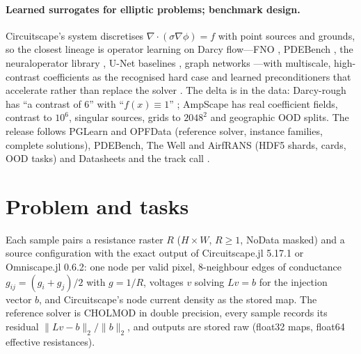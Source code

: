 \documentclass{article}
\begin{document}
\paragraph{Learned surrogates for elliptic problems; benchmark design.} Circuitscape's system discretises $\nabla\cdot(\sigma\nabla\phi)=f$ with point sources and grounds, so the closest lineage is operator learning on Darcy flow---FNO \citep{li2021}, PDEBench \citep{takamoto2022}, the neuraloperator library \citep{kossaifi2024}, U-Net baselines \citep{ronneberger2015,gupta2022}, graph networks \citep{battaglia2018,pfaff2021}---with multiscale, high-contrast coefficients as the recognised hard case \citep{liu2024,he2024,xu2024,haltmayer2026,trifonov2024} and learned preconditioners that accelerate rather than replace the solver \citep{lan2024,li2023}. The delta is in the data: Darcy-rough has ``a contrast of 6'' with ``$f(x)\equiv 1$'' \citep{xu2024}; AmpScape has real coefficient fields, contrast to $10^6$, singular sources, grids to $2048^2$ and geographic OOD splits. The release follows PGLearn and OPFData \citep{klamkin2025,lovett2024,joswigjones2021} (reference solver, instance families, complete solutions), PDEBench, The Well and AirfRANS \citep{ohana2024,bonnet2022} (HDF5 shards, cards, OOD tasks) and Datasheets and the track call \citep{gebru2021,neurips2026cfp}.

\section{Problem and tasks}
\label{sec:tasks}

Each sample pairs a resistance raster $R$ ($H\times W$, $R\ge 1$, NoData masked) and a source configuration with the exact output of Circuitscape.jl 5.17.1 or Omniscape.jl 0.6.2: one node per valid pixel, 8-neighbour edges of conductance $g_{ij}=(g_i+g_j)/2$ with $g=1/R$, voltages $v$ solving $Lv=b$ for the injection vector $b$, and Circuitscape's node current density as the stored map. The reference solver is CHOLMOD in double precision, every sample records its residual $\|Lv-b\|_2/\|b\|_2$, and outputs are stored raw (float32 maps, float64 effective resistances).
\end{document}
